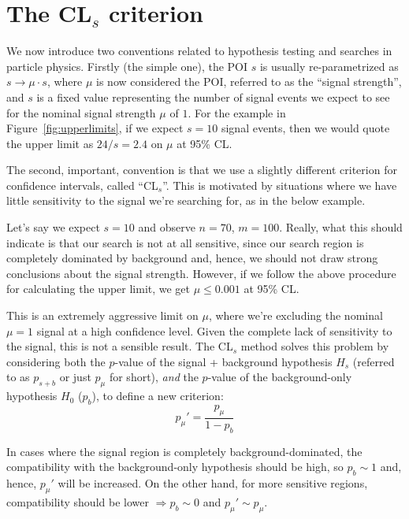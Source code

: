 \section{The \texorpdfstring{CL$_s$}{CLs} criterion}
\label{sec:cls}

We now introduce two conventions related to hypothesis testing and searches in particle physics.
Firstly (the simple one), the POI $s$ is usually re-parametrized as $s \rightarrow \mu \cdot s$,
where $\mu$ is now considered the POI, referred to as the ``signal strength'', and $s$ is a fixed value representing the number of signal events we expect to see for the nominal signal strength $\mu$ of $1$.
For the example in Figure~\ref{fig:upperlimits}, if we expect $s = 10$ signal events, then we would quote the upper limit as $24 / s = 2.4$ on $\mu$ at 95\% CL.

The second, important, convention is that we use a slightly different criterion for confidence intervals, called ``CL$_s$''.
This is motivated by situations where we have little sensitivity to the signal we're searching for, as in the below example.

\begin{example}
\label{ex:cls}
Let's say we expect $s = 10$ and observe $n = 70$, $m = 100$.
Really, what this should indicate is that our search is not at all sensitive, since our search region is completely dominated by background and, hence, we should not draw strong conclusions about the signal strength.
However, if we follow the above procedure for calculating the upper limit, we get $\mu \leq 0.001$ at 95\% CL.
\end{example}

This is an extremely aggressive limit on $\mu$, where we're excluding the nominal $\mu = 1$ signal at a high confidence level.
Given the complete lack of sensitivity to the signal, this is not a sensible result.
The CL$_s$ method solves this problem by considering both the $p$-value of the signal + background hypothesis $H_s$ (referred to as $p_{s+b}$ or just $p_\mu$ for short), \textit{and} the $p$-value of the background-only hypothesis $H_0$ ($p_b$), to define a new criterion:
\begin{equation}
p_\mu' = \frac{p_\mu}{1 - p_b}
\label{eq:pmu_prime}
\end{equation}

In cases where the signal region is completely background-dominated, the compatibility with the background-only hypothesis should be high, so $p_b \sim 1$ and, hence, $p_\mu'$ will be increased.
On the other hand, for more sensitive regions, compatibility should be lower $\Rightarrow p_b \sim 0$ and $p_\mu' \sim p_\mu$.

